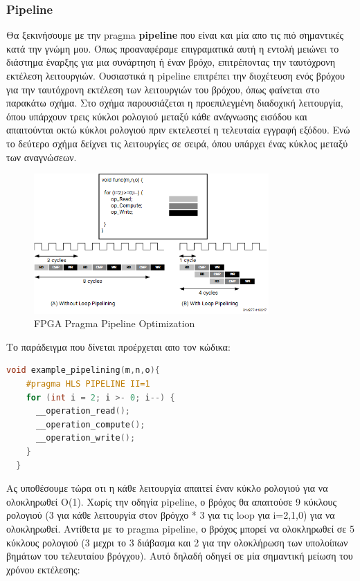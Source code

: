 \subsubsection{Pipeline}
Θα ξεκινήσουμε με την pragma \textbf{pipeline} που είναι και μία απο τις πιό σημαντικές κατά την γνώμη μου. Όπως προαναφέραμε επιγραματικά αυτή η εντολή
μειώνει το διάστημα έναρξης για μια συνάρτηση ή έναν βρόχο, επιτρέποντας την ταυτόχρονη εκτέλεση λειτουργιών. Ουσιαστικά η pipeline επιτρέπει την
διοχέτευση ενός βρόχου για την ταυτόχρονη εκτέλεση των λειτουργιών του βρόχου, όπως φαίνεται στο παρακάτω σχήμα. Στο σχήμα παρουσιάζεται η προεπιλεγμένη
διαδοχική λειτουργία, όπου υπάρχουν τρεις κύκλοι ρολογιού μεταξύ κάθε ανάγνωσης εισόδου και απαιτούνται οκτώ κύκλοι ρολογιού πριν εκτελεστεί η τελευταία εγγραφή εξόδου.
Ενώ το δεύτερο σχήμα δείχνει τις λειτουργίες σε σειρά, όπου υπάρχει ένας κύκλος μεταξύ των αναγνώσεων.

\begin{figure}[h!]
  \centering
  \includegraphics[width=0.8\textwidth]{figures/chapter3/fpga_pipelining.png}
  \caption{FPGA Pragma Pipeline Optimization}
  \label{fig:fpga_pipelining}
\end{figure}

Το παράδειγμα που δίνεται προέρχεται απο τον κώδικα:
\begin{lstlisting}[language=C++, caption={Παράδειγμα χρήσης Pipelining}]
  void example_pipelining(m,n,o){
    #pragma HLS PIPELINE II=1
    for (int i = 2; i >- 0; i--) {
      __operation_read();
      __operation_compute();
      __operation_write();
    }
  }
\end{lstlisting}
  
Ας υποθέσουμε τώρα οτι η κάθε λειτουργία απαιτεί έναν κύκλο ρολογιού για να ολοκληρωθεί Ο(1).
Χωρίς την οδηγία pipeline, ο βρόχος θα απαιτούσε 9 κύκλους ρολογιού (3 για κάθε λειτουργία στον βρόγχο * 3 για τις loop για i=2,1,0) για να ολοκληρωθεί.
Αντίθετα με το pragma pipeline, ο βρόχος μπορεί να ολοκληρωθεί σε 5 κύκλους ρολογιού (3 μεχρι το 3 διάβασμα και 2 για την ολοκλήρωση των υπολοίπων βημάτων του τελευταίου βρόγχου).
Αυτό δηλαδή οδηγεί σε μία σημαντική μείωση του χρόνου εκτέλεσης:

